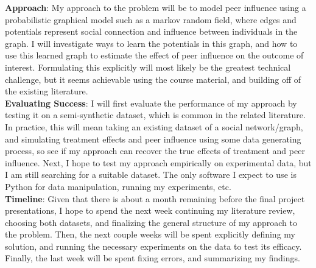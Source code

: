\documentclass{article}
\begin{document}
\textbf{Approach}: My approach to the problem will be to model peer influence using a probabilistic graphical model such as a markov random field, where edges and potentials represent social connection and influence between individuals in the graph. I will investigate ways to learn the potentials in this graph, and how to use this learned graph to estimate the effect of peer influence on the outcome of interest. Formulating this explicitly will most likely be the greatest technical challenge, but it seems achievable using the course material, and building off of the existing literature.  \\[1.0ex]
\textbf{Evaluating Success}: I will first evaluate the performance of my approach by testing it on a semi-synthetic dataset, which is common in the related literature. In practice, this will mean taking an existing dataset of a social network/graph, and simulating treatment effects and peer influence using some data generating process, so see if my approach can recover the true effects of treatment and peer influence. Next, I hope to test my approach empirically on experimental data, but I am still searching for a suitable dataset. The only software I expect to use is Python for data manipulation, running my experiments, etc. \\[1.0ex] 
\textbf{Timeline}: Given that there is about a month remaining before the final project presentations, I hope to spend the next week continuing my literature review, choosing both datasets, and finalizing the general structure of my approach to the problem. Then, the next couple weeks will be spent explicitly defining my solution, and running the necessary experiments on the data to test its efficacy. Finally, the last week will be spent fixing errors, and summarizing my findings.
\end{document}
